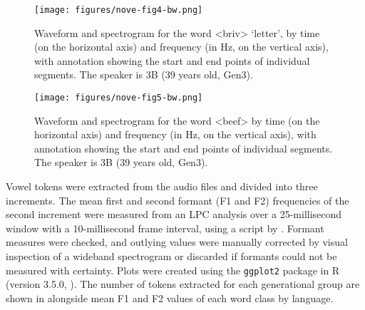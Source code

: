 \documentclass[output=paper]{langsci/langscibook}
\begin{document}
\begin{figure}
\texttt{[image: figures/nove-fig4-bw.png]}
\caption{Waveform and spectrogram for the word <briv> ‘letter’, by time (on the horizontal axis) and frequency (in Hz, on the vertical axis), with annotation showing the start and end points of individual segments. The speaker is 3B (39 years old, Gen3).}
\label{fig:nove:4}
\end{figure} 

 

 \begin{figure}
 \texttt{[image: figures/nove-fig5-bw.png]}
\caption{Waveform and spectrogram for the word <beef> by time (on the horizontal axis) and frequency (in Hz, on the vertical axis), with annotation showing the start and end points of individual segments. The speaker is 3B (39 years old, Gen3).}
\label{fig:nove:5}
\end{figure} 

Vowel tokens were extracted from the audio files and divided into three increments. The mean first and second formant (F1 and F2) frequencies of the second increment were measured from an LPC analysis over a 25-millisecond window with a 10-millisecond frame interval, using a script by \citet{Kang2016}. Formant measures were checked, and outlying values were manually corrected by visual inspection of a wideband spectrogram or discarded if formants could not be measured with certainty. Plots were created using the \texttt{ggplot2} package \citep{Wickham2009} in R (version 3.5.0, \citealt{RCore2017}). The number of tokens extracted for each generational group are shown in  alongside mean F1 and F2 values of each word class by language.
\clearpage
\end{document}
